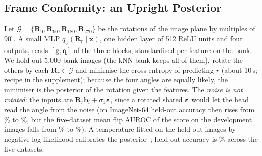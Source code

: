 \documentclass{article}
\newcommand{\veps}{\boldsymbol{\varepsilon}}
\newcommand{\Rot}[1]{\mathbf{R}_{#1}}
\newcommand{\mG}{\mathcal{G}}
\begin{document}
\subsection{Frame Conformity: an Upright Posterior}
\label{sec:pose}
Let $\mG=\{\Rot{0},\Rot{90},\Rot{180},\Rot{270}\}$ be the rotations of the image plane by multiples of $90^\circ$. A small MLP $q_\phi(\Rot{r}\mid\mathbf{x})$, one hidden layer of 512 ReLU units and four outputs, reads $[\mathbf{g},\mathbf{q}]$ of the three blocks, standardised per feature on the bank. We hold out 5{,}000 bank images (the kNN bank keeps all of them), rotate the others by each $\Rot{r}\in\mG$ and minimise the cross-entropy of predicting $r$ (about 10\,s; recipe in the supplement); because the four angles are equally likely, the minimiser is the posterior of the rotation given the features. The \emph{noise is not rotated}: the inputs are $\Rot{r}\mathbf{b}_i+\sigma_1\veps$, since a rotated shared $\veps$ would let the head read the angle from the noise (on ImageNet-64 held-out accuracy then rises from \cleanAccIN\% to \leakAccIN\%, but the five-dataset mean flip AUROC of the score on the development images falls from \abVfA\% to \abVfG\%). A temperature fitted on the held-out images by negative log-likelihood calibrates the posterior~\cite{guo2017calibration}; held-out accuracy is \headAccRange\% across the five datasets.
\end{document}
